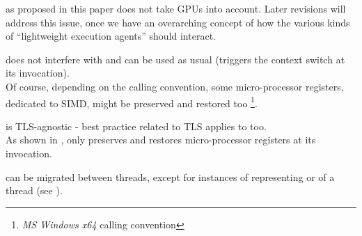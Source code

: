 \newpage
{}


\cc as proposed in this paper does not take GPUs into account. Later revisions
will address this issue, once we have an overarching concept of how the various
kinds of ``lightweight execution agents'' should interact.



does not interfere with \cc and can be used as usual (\cc triggers the context
switch at its invocation).\\
Of course, depending on the calling convention, some micro-processor registers,
dedicated to SIMD, might be preserved and restored too
\footnote{\emph{MS Windows x64} calling convention}.



\cc is TLS-agnostic - best practice related to TLS applies to \cc too.\\
As shown in , \cc only preserves and restores
micro-processor registers at its invocation.



\cont can be migrated between threads, except for instances of
\cont representing \main or \entryfn of a thread (see ).
